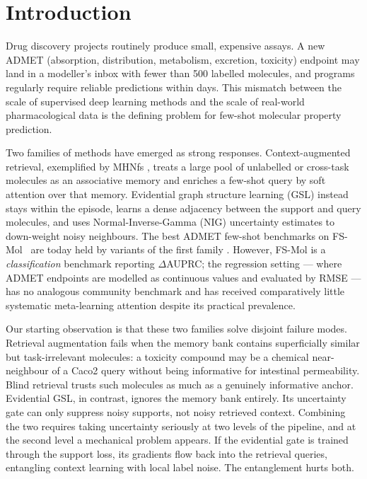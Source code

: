 \documentclass{article}
\theoremstyle{plain}
\theoremstyle{definition}
\theoremstyle{remark}
\begin{document}
\section{Introduction}

Drug discovery projects routinely produce small, expensive assays. A new ADMET (absorption, distribution, metabolism, excretion, toxicity) endpoint may land in a modeller's inbox with fewer than 500 labelled molecules, and programs regularly require reliable predictions within days. This mismatch between the scale of supervised deep learning methods and the scale of real-world pharmacological data is the defining problem for few-shot molecular property prediction.

Two families of methods have emerged as strong responses. Context-augmented retrieval, exemplified by MHNfs \citep{schimunek2023mhnfsiclr,schimunek2024mhnfs}, treats a large pool of unlabelled or cross-task molecules as an associative memory and enriches a few-shot query by soft attention over that memory. Evidential graph structure learning (GSL) \citep{amini2020deep,soleimany2021evidential,zhao2024gslmpp} instead stays within the episode, learns a dense adjacency between the support and query molecules, and uses Normal-Inverse-Gamma (NIG) uncertainty estimates to down-weight noisy neighbours. The best ADMET few-shot benchmarks on FS-Mol~\citep{stanley2021fsmol} are today held by variants of the first family \citep{chen2023adkfift,wang2024pintuning,unimatch2025}. However, FS-Mol is a \emph{classification} benchmark reporting $\Delta$AUPRC; the regression setting — where ADMET endpoints are modelled as continuous values and evaluated by RMSE — has no analogous community benchmark and has received comparatively little systematic meta-learning attention despite its practical prevalence.

Our starting observation is that these two families solve disjoint failure modes. Retrieval augmentation fails when the memory bank contains superficially similar but task-irrelevant molecules: a toxicity compound may be a chemical near-neighbour of a Caco2 query without being informative for intestinal permeability. Blind retrieval trusts such molecules as much as a genuinely informative anchor. Evidential GSL, in contrast, ignores the memory bank entirely. Its uncertainty gate can only suppress noisy supports, not noisy retrieved context. Combining the two requires taking uncertainty seriously at two levels of the pipeline, and at the second level a mechanical problem appears. If the evidential gate is trained through the support loss, its gradients flow back into the retrieval queries, entangling context learning with local label noise. The entanglement hurts both.
\end{document}
